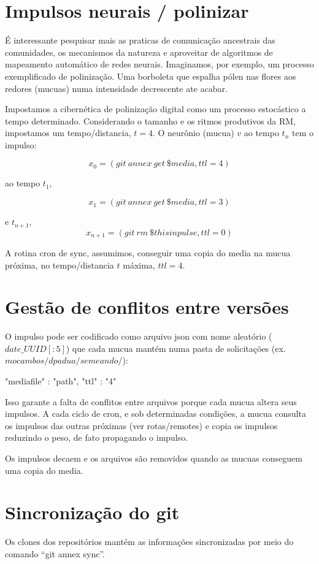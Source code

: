 \section{Impulsos neurais / polinizar}
É interessante pesquisar mais as praticas de comunicação ancestrais
das comunidades, os mecanismos da natureza e aproveitar de algoritmos
de mapeamento automático de redes neurais. Imaginamos, por exemplo, um
processo exemplificado de polinização. Uma borboleta que espalha pólen
nas flores aos redores (mucuas) numa intensidade decrescente ate
acabar.

Impostamos a cibernética de polinização digital como um processo
estocástico a tempo determinado. Considerando o tamanho e os ritmos
produtivos da RM, impostamos um tempo/distancia, $t=4$. O neurônio (mucua)
$v$ ao tempo $t_{n}$ tem o impulso:

$$
x_0 = (git \ annex \ get \ \$media, ttl=4) 
$$

ao tempo $t_{1}$,

$$
x_1 = (git \ annex \ get \ \$media, ttl=3)
$$

e $t_{n+1}$,
$$
x_{n+1} = (git \ rm  \ \$thisinpulse, ttl=0)
$$

A rotina cron de sync, assumimos, conseguir uma copia do media na
mucua próxima, no tempo/distancia $t$ máxima, $ttl=4$.

\section{Gestão de conflitos entre versões}

O impulso pode ser codificado como arquivo json com nome aleatório
($date\_UUID[:5]$) que cada mucua mantém numa pasta de solicitações
(ex. $mocambos/dpadua/semeando/$):

\begin{code}
  {"mediafile" : "path", "ttl" : "4" } 
\end{code} 

Isso garante a falta de conflitos entre arquivos porque cada mucua
altera seus impulsos. A cada ciclo de cron, e sob determinadas
condições, a mucua consulta os impulsos das outras próximas (ver
rotas/remotes) e copia os impulsos reduzindo o peso, de fato
propagando o impulso.

Os impulsos decaem e os arquivos são removidos quando as mucuas
conseguem uma copia do media.  

\section{Sincronização do git}
Os clones dos repositórios mantém as informações sincronizadas por
meio do comando ``git annex sync''.

